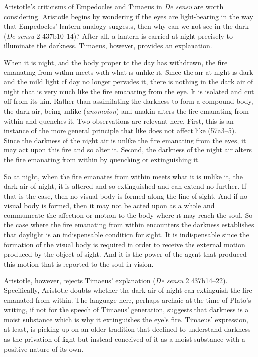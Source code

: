 Aristotle's criticisms of Empedocles and Timaeus in \emph{De sensu} are worth considering. Aristotle begins by wondering if the eyes are light-bearing in the way that Empedocles' lantern analogy suggests, then why can we not see in the dark (\emph{De sensu} 2 437b10--14)? After all, a lantern is carried at night precisely to illuminate the darkness. Timaeus, however, provides an explanation.

When it is night, and the body proper to the day has withdrawn, the fire emanating from within meets with what is unlike it. Since the air at night is dark and the mild light of day no longer pervades it, there is nothing in the dark air of night that is very much like the fire emanating from the eye. It is isolated and cut off from its kin. Rather than assimilating the darkness to form a compound body, the dark air, being unlike (\emph{anomoion}) and unakin alters the fire emanating from within and quenches it. Two observations are relevant here. First, this is an instance of the more general principle that like does not affect like (57a3--5). Since the darkness of the night air is unlike the fire emanating from the eyes, it may act upon this fire and so alter it. Second, the darkness of the night air alters the fire emanating from within by quenching or extinguishing it.

So at night, when the fire emanates from within meets what it is unlike it, the dark air of night, it is altered and so extinguished and can extend no further. If that is the case, then no visual body is formed along the line of sight. And if no visual body is formed, then it may not be acted upon as a whole and communicate the affection or motion to the body where it may reach the soul. So the case where the fire emanating from within encounters the darkness establishes that daylight is an indispensable condition for sight. It is indispensable since the formation of the visual body is required in order to receive the external motion produced by the object of sight. And it is the power of the agent that produced this motion that is reported to the soul in vision.

Aristotle, however, rejects Timaeus' explanation (\emph{De sensu} 2 437b14--22). Specifically, Aristotle doubts whe\-ther the dark air of night can extinguish the fire emanated from within. The language here, perhaps archaic at the time of Plato's writing, if not for the speech of Timaeus' generation, suggests that darkness is a moist substance which is why it extinguishes the eye's fire. Timaeus' expression, at least, is picking up on an older tradition that declined to understand darkness as the privation of light but instead conceived of it as a moist substance with a positive nature of its own.

